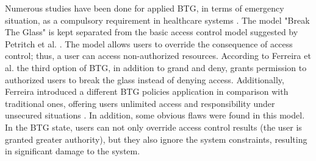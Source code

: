 \documentclass[conference]{IEEEtran}
\begin{document}
Numerous studies have been done for applied BTG, in terms of emergency situation, as a compulsory requirement in healthcare systems \cite{joint2004cocir}.
The model "Break The Glass" is kept separated from the basic access control model suggested by Petritch et al. \cite{petritsch2014generic}. 
The model allows users to override the consequence of access control; thus, a user can access non-authorized resources. 
According to Ferreira et al. \cite{ferreira2009securely} the third option of BTG, in addition to grand and deny, grants permission to authorized users to break the glass instead of denying access.
Additionally, Ferreira introduced a different BTG policies application in comparison with traditional ones, offering users unlimited access and responsibility under unsecured situations \cite{ferreira2006break}.
In addition, some obvious flaws were found in this model. 
In the BTG state, users can not only override access control results (the user is granted greater authority), but they also ignore the system constraints, resulting in significant damage to the system. 
\end{document}
